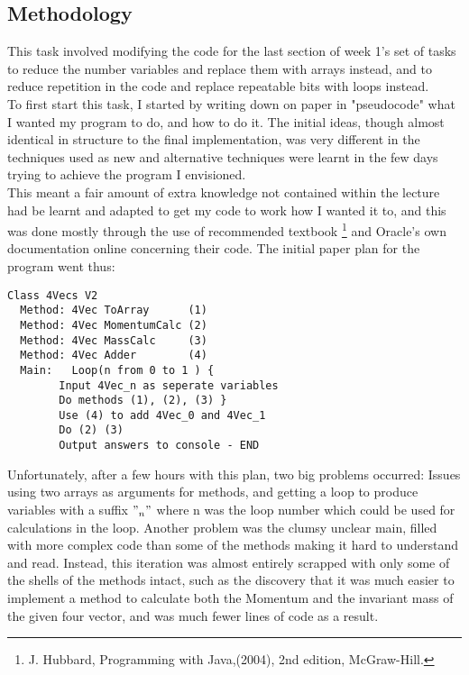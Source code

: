 \documentclass{article}
\begin{document}
\begin{multicols}{2}
		\subsection{Methodology}
		This task involved modifying the code for the last section of week 1's set of tasks to reduce the number variables and replace them with arrays instead, and to reduce repetition in the code and replace repeatable bits with loops instead. \\ \indent To first start this task, I started by writing down on paper in "pseudocode" what I wanted my program to do, and how to do it. The initial ideas, though almost identical in structure to the final implementation, was very different in the techniques used as new and alternative techniques were learnt in the few days trying to achieve the program I envisioned. \\ \indent This meant a fair amount of extra knowledge not contained within the lecture had be learnt and adapted to get my code to work how I wanted it to, and this was done mostly through the use of recommended textbook \footnote{J. Hubbard, Programming with Java,(2004), 2nd edition, McGraw-Hill. } and Oracle's own documentation online concerning their code. The initial paper plan for the program went thus:
		\begin{lstlisting}
Class 4Vecs V2
  Method: 4Vec ToArray      (1)
  Method: 4Vec MomentumCalc (2)
  Method: 4Vec MassCalc     (3)
  Method: 4Vec Adder        (4)
  Main:   Loop(n from 0 to 1 ) {
	    Input 4Vec_n as seperate variables
	    Do methods (1), (2), (3) }
	    Use (4) to add 4Vec_0 and 4Vec_1
	    Do (2) (3)
	    Output answers to console - END
		\end{lstlisting}
		Unfortunately, after a few hours with this plan, two big problems occurred: Issues using two arrays as arguments for methods, and getting a loop to produce variables with a suffix $"_ n"$ where n was the loop number which could be used for calculations in the loop. Another problem was the clumsy unclear main, filled with more complex code than some of the methods making it hard to understand and read. Instead, this iteration was almost entirely scrapped with only some of the shells of the methods intact, such as the discovery that it was much easier to implement a method to calculate both the Momentum and the invariant mass of the given four vector, and was much fewer lines of code as a result.
		

\end{multicols}
\end{document}
